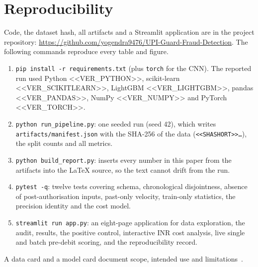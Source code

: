 \documentclass[conference]{IEEEtran}
\begin{document}
\section{Reproducibility}
Code, the dataset hash, all artifacts and a Streamlit application are in the project repository: \url{https://github.com/yogendra9476/UPI-Guard-Fraud-Detection}. The following commands reproduce every table and figure.
\begin{enumerate}
\item \texttt{pip install -r requirements.txt} (plus \texttt{torch} for the CNN). The reported run used Python <<VER_PYTHON>>, scikit-learn <<VER_SCIKITLEARN>>, LightGBM <<VER_LIGHTGBM>>, pandas <<VER_PANDAS>>, NumPy <<VER_NUMPY>> and PyTorch <<VER_TORCH>>.
\item \texttt{python run\_pipeline.py}: one seeded run (seed 42), which writes \texttt{artifacts/manifest.json} with the SHA-256 of the data (\texttt{<<SHASHORT>>\ldots}), the split counts and all metrics.
\item \texttt{python build\_report.py}: inserts every number in this paper from the artifacts into the \LaTeX{} source, so the text cannot drift from the run.
\item \texttt{pytest -q}: twelve tests covering schema, chronological disjointness, absence of post-authorisation inputs, past-only velocity, train-only statistics, the precision identity and the cost model.
\item \texttt{streamlit run app.py}: an eight-page application for data exploration, the audit, results, the positive control, interactive INR cost analysis, live single and batch pre-debit scoring, and the reproducibility record.
\end{enumerate}
A data card and a model card document scope, intended use and limitations~\cite{gebru2021,mitchell2019}.

\end{document}
